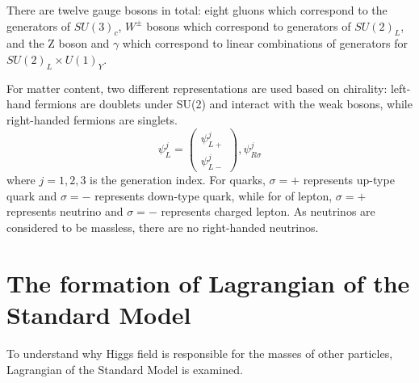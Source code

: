 \par There are twelve gauge bosons in total: eight gluons which correspond to the generators of $SU(3)_c$, $W^{\pm}$ bosons which correspond to generators of $SU(2)_L$, and the Z boson and $\gamma$ which correspond to linear combinations of generators for $SU(2)_L \times U(1)_Y$.

\par For matter content, two different representations are used based on chirality: left-hand fermions are doublets under SU(2) and interact with the weak bosons, while right-handed fermions are singlets.
\begin{equation}
  \psi_L^{j}=\left( \begin{smallmatrix} \psi_{L+}^{j}\\ \psi_{L-}^{j} \end{smallmatrix}\right),  \psi_{R\sigma}^{j}
  \label{eq:fermion}
\end{equation}
where $j=1,2,3$ is the generation index. For quarks, $\sigma=+$ represents up-type quark and $\sigma=-$ represents down-type quark, while for of lepton, $\sigma=+$ represents neutrino and $\sigma=-$ represents charged lepton. As neutrinos are considered to be massless, there are no right-handed neutrinos.

\section{The formation of Lagrangian of the Standard Model}
\par To understand why Higgs field is responsible for the masses of other particles, Lagrangian of the Standard Model is examined.

